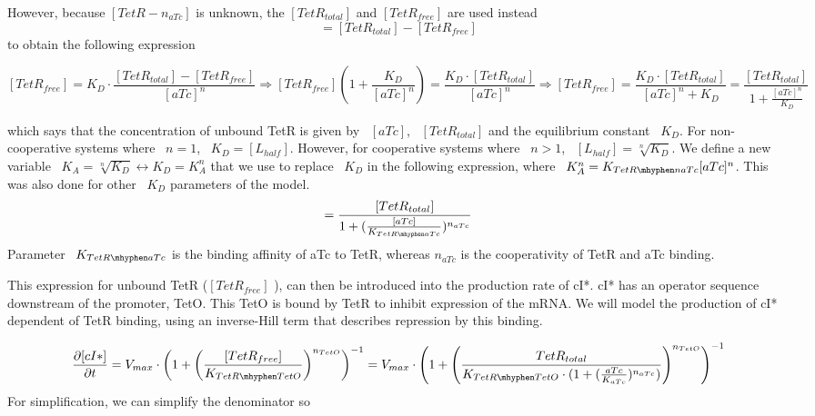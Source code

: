 However, because $[TetR-n_{aTc}]$ is unknown, the $[TetR_{total}]$ and $[TetR_{free}]$ are used instead
\begin{equation}
[TetR \mhyphen naTc] = [TetR_{total}] - [TetR_{free}]
\end{equation}
to obtain the following expression

\begin{subequations}
    \begin{equation}
    [TetR_{free}] = K_{D} \cdot \frac{[TetR_{total}] - [TetR_{free}]}{[aTc]^n} \Longrightarrow
    \end{equation}
    \begin{equation}
    [TetR_{free}] (1+\frac{K_{D}}{[aTc]^n}) = \frac{K_{D}\cdot [TetR_{total}]}{[aTc]^n}\Longrightarrow
    \end{equation}
    \begin{equation}
    [TetR_{free}] = \frac{K_{D}\cdot[TetR_{total}]}{[aTc]^n+K_{D}} = \frac{[TetR_{total}]}{1+\frac{[aTc]^n}{K_{D}}}
    \end{equation}
\end{subequations}

which says that the concentration of unbound TetR is given by ~$[aTc]$, ~$[TetR_{total}]$ and the equilibrium constant ~$K_{D}$.
For non-cooperative systems where ~$n=1$, ~$K_{D}=[L_{half}]$.
However, for cooperative systems where ~$n>1$, ~$[L_{half}] = \sqrt[n]{K_{D}}$.
We define a new variable ~$K_{A} = \sqrt[n]{K_{D}} \leftrightarrow K_{D} = K^n_{A}$ that we use to replace ~$K_{D}$ in the following expression, where ~$K^n_{A} = K_{TetR \mhyphen naTc}{[aTc]^n}$.
This was also done for other ~$K_{D}$ parameters of the model.
\begin{equation}
[TetR_{free}] =  \frac{[TetR_{total}]}{1+(\frac{[aTc]}{K_{TetR \mhyphen aTc}})^{n_{aTc}}}
\end{equation}
Parameter ~$K_{TetR \mhyphen aTc}$ is the binding affinity of aTc to TetR, whereas $n_{aTc}$ is the cooperativity of TetR and aTc binding.

\para
This expression for unbound TetR ($[TetR_{free}]$ ), can then be introduced into the production rate of cI*. cI* has an operator sequence downstream of the promoter, TetO. This TetO is bound by TetR to inhibit expression of the mRNA. We will model the production of cI* dependent of TetR binding, using an inverse-Hill term that describes repression by this binding.

\begin{equation}
    \pdv{[cI*]}{t} = V_{max}\cdot \left(1+\left(\frac{[TetR_{free}]}{K_{TetR \mhyphen TetO}}\right)^{n_{TetO}}\right)^{-1} = V_{max} \cdot \left(1+\left(\frac{TetR_{total}}{K_{TetR \mhyphen TetO}\cdot(1+(\frac{aTc}{K_{aTc}})^{n_{aTc}})}\right)^{n_{TetO}}\right)^{-1}
\end{equation}
For simplification, we can simplify the denominator so

